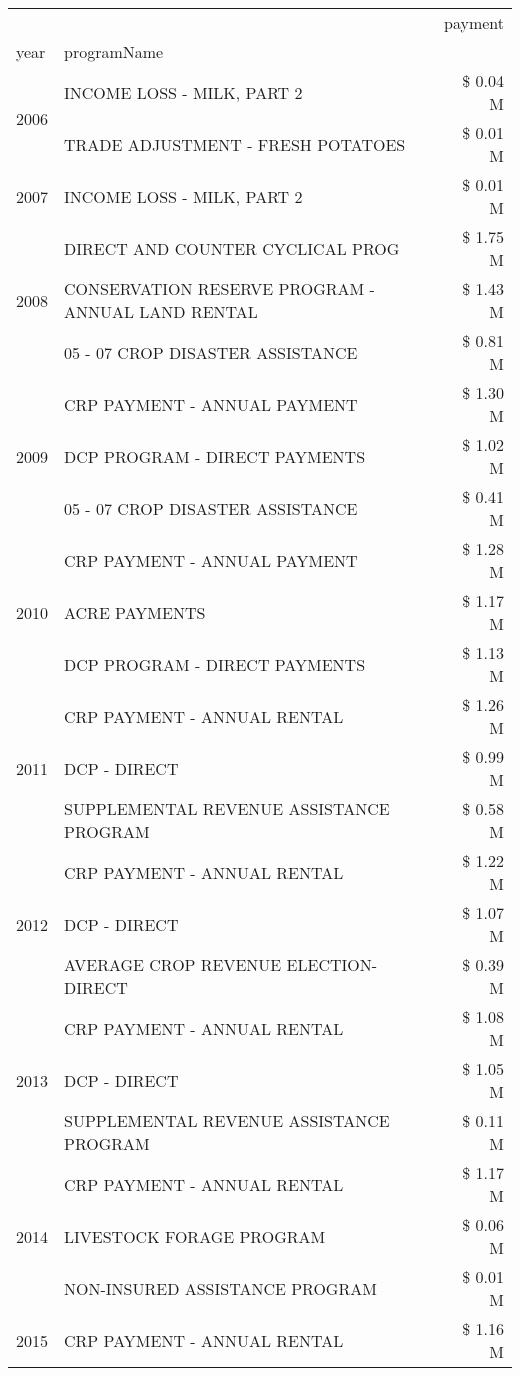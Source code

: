 \begin{tabular}{llr}
\toprule
 &  & payment \\
year & programName &  \\
\midrule
\multirow[t]{2}{*}{2006} & INCOME LOSS - MILK, PART 2 & \$ 0.04 M \\
 & TRADE ADJUSTMENT - FRESH POTATOES & \$ 0.01 M \\
\cline{1-3}
2007 & INCOME LOSS - MILK, PART 2 & \$ 0.01 M \\
\cline{1-3}
\multirow[t]{3}{*}{2008} & DIRECT AND COUNTER CYCLICAL PROG & \$ 1.75 M \\
 & CONSERVATION RESERVE PROGRAM - ANNUAL LAND RENTAL & \$ 1.43 M \\
 & 05 - 07 CROP DISASTER ASSISTANCE & \$ 0.81 M \\
\cline{1-3}
\multirow[t]{3}{*}{2009} & CRP PAYMENT - ANNUAL PAYMENT & \$ 1.30 M \\
 & DCP PROGRAM - DIRECT PAYMENTS & \$ 1.02 M \\
 & 05 - 07 CROP DISASTER ASSISTANCE & \$ 0.41 M \\
\cline{1-3}
\multirow[t]{3}{*}{2010} & CRP PAYMENT - ANNUAL PAYMENT & \$ 1.28 M \\
 & ACRE PAYMENTS & \$ 1.17 M \\
 & DCP PROGRAM - DIRECT PAYMENTS & \$ 1.13 M \\
\cline{1-3}
\multirow[t]{3}{*}{2011} & CRP PAYMENT - ANNUAL RENTAL & \$ 1.26 M \\
 & DCP - DIRECT & \$ 0.99 M \\
 & SUPPLEMENTAL REVENUE ASSISTANCE PROGRAM & \$ 0.58 M \\
\cline{1-3}
\multirow[t]{3}{*}{2012} & CRP PAYMENT - ANNUAL RENTAL & \$ 1.22 M \\
 & DCP - DIRECT & \$ 1.07 M \\
 & AVERAGE CROP REVENUE ELECTION-DIRECT & \$ 0.39 M \\
\cline{1-3}
\multirow[t]{3}{*}{2013} & CRP PAYMENT - ANNUAL RENTAL & \$ 1.08 M \\
 & DCP - DIRECT & \$ 1.05 M \\
 & SUPPLEMENTAL REVENUE ASSISTANCE PROGRAM & \$ 0.11 M \\
\cline{1-3}
\multirow[t]{3}{*}{2014} & CRP PAYMENT - ANNUAL RENTAL & \$ 1.17 M \\
 & LIVESTOCK FORAGE PROGRAM & \$ 0.06 M \\
 & NON-INSURED ASSISTANCE PROGRAM & \$ 0.01 M \\
\cline{1-3}
\multirow[t]{3}{*}{2015} & CRP PAYMENT - ANNUAL RENTAL & \$ 1.16 M \\

\end{tabular}
